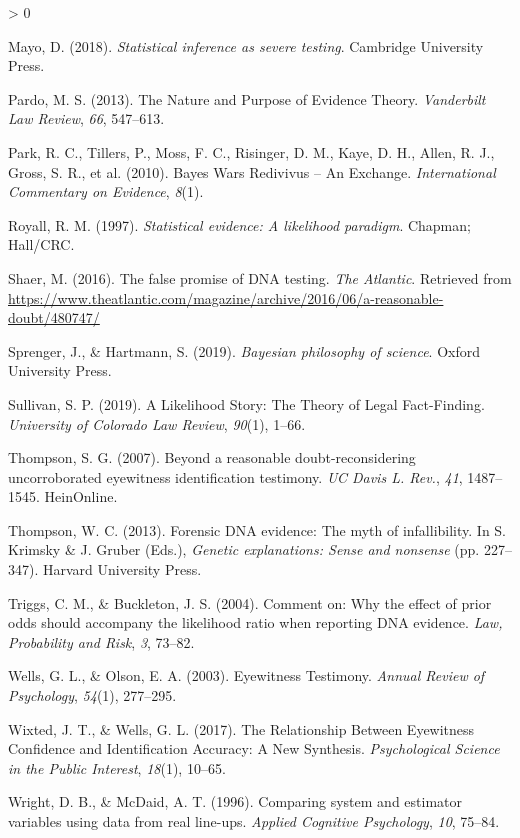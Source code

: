 \documentclass[
  10pt,
  dvipsnames,enabledeprecatedfontcommands]{scrartcl}
\newlength{\cslhangindent}
\newenvironment{CSLReferences}[2] %
 {%
  \setlength{\parindent}{0pt}
  \ifodd #1 \everypar{\setlength{\hangindent}{\cslhangindent}}\ignorespaces\fi
  \ifnum #2 > 0
  \setlength{\parskip}{#2\baselineskip}
  \fi
 }%
 {}
\begin{document}
\begin{CSLReferences}{1}{0}
\leavevmode\hypertarget{ref-mayo2018}{}%
Mayo, D. (2018). \emph{Statistical inference as severe testing}.
Cambridge University Press.

\leavevmode\hypertarget{ref-pardo2013NaturePurposeEvidence}{}%
Pardo, M. S. (2013). The {Nature} and {Purpose} of {Evidence Theory}.
\emph{Vanderbilt Law Review}, \emph{66}, 547--613.

\leavevmode\hypertarget{ref-park2010BayesWarsRedivivus}{}%
Park, R. C., Tillers, P., Moss, F. C., Risinger, D. M., Kaye, D. H.,
Allen, R. J., Gross, S. R., et al. (2010). Bayes {Wars Redivivus} -- {An
Exchange}. \emph{International Commentary on Evidence}, \emph{8}(1).

\leavevmode\hypertarget{ref-Royall1997}{}%
Royall, R. M. (1997). \emph{Statistical evidence: A likelihood
paradigm}. Chapman; Hall/CRC.

\leavevmode\hypertarget{ref-Shaer2016False}{}%
Shaer, M. (2016). The false promise of DNA testing. \emph{The Atlantic}.
Retrieved from
\url{https://www.theatlantic.com/magazine/archive/2016/06/a-reasonable-doubt/480747/}

\leavevmode\hypertarget{ref-sprenger2019bayesian}{}%
Sprenger, J., \& Hartmann, S. (2019). \emph{Bayesian philosophy of
science}. Oxford University Press.

\leavevmode\hypertarget{ref-sullivan2016LikelihoodStoryTheory}{}%
Sullivan, S. P. (2019). A {Likelihood Story}: {The Theory} of {Legal
Fact}-{Finding}. \emph{University of Colorado Law Review}, \emph{90}(1),
1--66.

\leavevmode\hypertarget{ref-thompson2007beyond}{}%
Thompson, S. G. (2007). Beyond a reasonable doubt-reconsidering
uncorroborated eyewitness identification testimony. \emph{UC Davis L.
Rev.}, \emph{41}, 1487--1545. HeinOnline.

\leavevmode\hypertarget{ref-thompson2012forensic}{}%
Thompson, W. C. (2013). Forensic DNA evidence: The myth of
infallibility. In S. Krimsky \& J. Gruber (Eds.), \emph{Genetic
explanations: Sense and nonsense} (pp. 227--347). Harvard University
Press.

\leavevmode\hypertarget{ref-triggsCommentWhyEffect}{}%
Triggs, C. M., \& Buckleton, J. S. (2004). Comment on: {Why} the effect
of prior odds should accompany the likelihood ratio when reporting {DNA}
evidence. \emph{Law, Probability and Risk}, \emph{3}, 73--82.

\leavevmode\hypertarget{ref-wells2003EyewitnessTestimony}{}%
Wells, G. L., \& Olson, E. A. (2003). Eyewitness {Testimony}.
\emph{Annual Review of Psychology}, \emph{54}(1), 277--295.

\leavevmode\hypertarget{ref-wixted2017RelationshipEyewitnessConfidence}{}%
Wixted, J. T., \& Wells, G. L. (2017). The {Relationship Between
Eyewitness Confidence} and {Identification Accuracy}: {A New Synthesis}.
\emph{Psychological Science in the Public Interest}, \emph{18}(1),
10--65.

\leavevmode\hypertarget{ref-Wright1996ComparingSystemEstimator}{}%
Wright, D. B., \& McDaid, A. T. (1996). Comparing system and estimator
variables using data from real line-ups. \emph{Applied Cognitive
Psychology}, \emph{10}, 75--84.

\end{CSLReferences}
\end{document}
